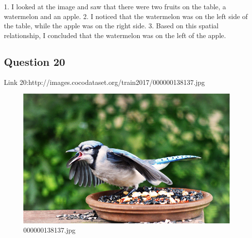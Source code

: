 \begin{enumerate}
        1. I looked at the image and saw that there were two fruits on the table, a watermelon and an apple.
        2. I noticed that the watermelon was on the left side of the table, while the apple was on the right side.
        3. Based on this spatial relationship, I concluded that the watermelon was on the left of the apple.
    \end{enumerate}
\subsection*{Question 20}
Link 20:http://images.cocodataset.org/train2017/000000138137.jpg
    \begin{figure}[h]
        \centering
        \includegraphics[width=0.8\linewidth]{../image set/easy/000000138137.jpg}
        \caption{000000138137.jpg}
    \end{figure}
